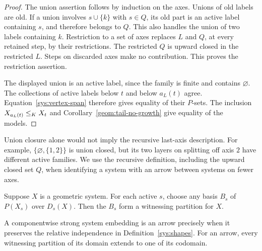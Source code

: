 \begin{proof}
The union assertion follows by induction on the axes.  Unions of old
labels are old.  If a union involves $s\cup\{k\}$ with $s\in Q$, its
old part is an active label containing $s$, and therefore belongs to
$Q$.  This also handles the union of two labels containing $k$.
Restriction to a set of axes replaces $L$ and $Q$, at every retained
step, by their restrictions.  The restricted $Q$ is upward closed in
the restricted $L$.  Steps on discarded axes make no contribution.
This proves the restriction assertion.

The displayed union is an active label, since the family is finite and
contains $\varnothing$.  The collections of active labels below $t$
and below $a_L(t)$ agree.  Equation~\eqref{sys:vertex-span} therefore
gives equality of their $P$-sets.  The inclusion
$X_{a_L(t)}\leq_K X_t$ and
Corollary~\ref{geom:tail-no-growth} give equality of the models.
\end{proof}

\begin{remark}
Union closure alone would not imply the recursive last-axis
description.  For example, $\{\varnothing,\{1,2\}\}$ is union closed,
but its two layers on splitting off axis $2$ have different active
families.  We use the recursive definition, including the upward
closed set $Q$, when identifying a system with an arrow between
systems on fewer axes.
\end{remark}

\begin{lemma}
\label{sys:relative-bases}
Suppose $X$ is a geometric system.  For each active $s$, choose any
basis $B_s$ of $P(X_s)$ over $D_s(X)$.  Then the $B_s$ form a
witnessing partition for $X$.

A componentwise strong system embedding is an arrow precisely when
it preserves the relative independence in
Definition~\ref{sys:shapes}.  For an arrow, every witnessing partition
of its domain extends to one of its codomain.
\end{lemma}


